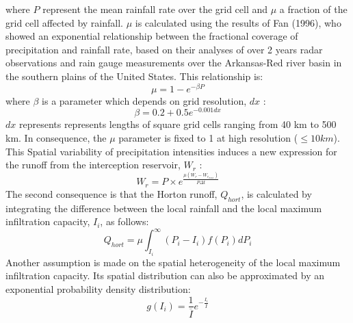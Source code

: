 where $P$ represent the mean rainfall rate over the grid cell and $\mu$ a fraction of the grid cell 
affected by rainfall. $\mu$ is calculated using the results of Fan \etal (1996)\nocite{Fan1996}, who showed an 
exponential relationship between the fractional coverage of precipitation and rainfall rate, 
based on their analyses of over 2 years radar observations and rain gauge measurements over 
the Arkansas-Red river basin in the southern plains of the United States. This relationship is:
%
\begin{equation}
  \mu  = 1 - e^{-\beta P}
\end{equation}
%
where $\beta$ is a parameter which depends on grid resolution, $dx$ :
%
\begin{equation}
  \beta = 0.2 + 0.5 e^{-0.001dx}
\end{equation}
%
$dx$ represents represents lengths of square grid cells ranging from 40 km to 500 km. In consequence, the $\mu$ 
parameter is fixed to 1 at high resolution ($\leq 10km$). 
This Spatial variability of precipitation intensities induces a new expression for the 
runoff from the interception reservoir, $W_r$ :
%
\begin{equation}
  W_r = P \times e^{\frac{\mu(W_r-W_{r_{max}})}{P \Delta t}}
\end{equation}
%
The second consequence is that the Horton runoff, $Q_{hort}$, is calculated by integrating the 
difference between the local rainfall and the local maximum infiltration capacity, $I_i$, as 
follows:
%
\begin{equation}
  Q_{hort} = \mu\int^{\infty }_{I_i} \left(P_i - I_i\right) f(P_i) dP_i
  \label{eq:hort}
\end{equation}
%
Another assumption is made on the spatial heterogeneity of the local maximum infiltration 
capacity. Its spatial distribution can also be approximated by an exponential probability 
density distribution:
%
\begin{equation}
  g(I_i) = \frac{1}{\overline{I}}e^{ - \frac{I_i}{\overline{I}}}
\end{equation}


